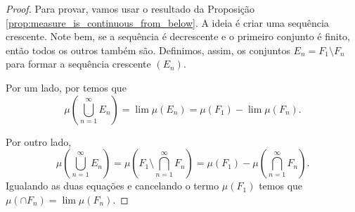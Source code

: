 \begin{proof}
    Para provar, vamos usar o resultado da Proposição \ref{prop:measure_is_continuous_from_below}. A ideia é criar uma sequência crescente. Note bem, se a sequência é decrescente e o primeiro conjunto é finito, então todos os outros também são. Definimos, assim, os conjuntos $E_n=F_1\setminus F_n$ para formar a sequência crescente $(E_n)$.

    Por um lado, por  temos que
    \begin{equation*}
        \mu\left(\bigcup_{n=1}^{\infty} E_n\right) = \lim \mu (E_n) = \mu(F_1) - \lim \mu(F_n).
    \end{equation*}

    Por outro lado,
    \begin{equation*}
        \mu\left(\bigcup_{n=1}^{\infty} E_n\right) = \mu\left(F_1\setminus \bigcap_{n=1}^{\infty} F_n\right) = \mu(F_1) - \mu\left( \bigcap_{n=1}^{\infty} F_n\right).
    \end{equation*}
    Igualando as duas equações e cancelando o termo $\mu(F_1)$ temos que $\mu(\cap F_n)=\lim \mu(F_n)$.
    
\end{proof}